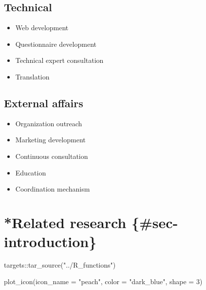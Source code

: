 \documentclass[
  letterpaper,
  DIV=11,
  numbers=noendperiod,
  oneside]{scrreprt}
\newenvironment{Shaded}{\begin{snugshade}}{\end{snugshade}}
\newcommand{\AttributeTok}[1]{\textcolor[rgb]{0.40,0.45,0.13}{#1}}
\newcommand{\DecValTok}[1]{\textcolor[rgb]{0.68,0.00,0.00}{#1}}
\newcommand{\FunctionTok}[1]{\textcolor[rgb]{0.28,0.35,0.67}{#1}}
\newcommand{\NormalTok}[1]{\textcolor[rgb]{0.00,0.23,0.31}{#1}}
\newcommand{\SpecialCharTok}[1]{\textcolor[rgb]{0.37,0.37,0.37}{#1}}
\newcommand{\StringTok}[1]{\textcolor[rgb]{0.13,0.47,0.30}{#1}}
\providecommand{\tightlist}{%
  \setlength{\itemsep}{0pt}\setlength{\parskip}{0pt}}\usepackage{longtable,booktabs,array}
\begin{document}
\hypertarget{technical}{%
\section{Technical}\label{technical}}

\begin{itemize}
\tightlist
\item
  Web development
\item
  Questionnaire development
\item
  Technical expert consultation
\item
  Translation
\end{itemize}

\hypertarget{external-affairs}{%
\section{External affairs}\label{external-affairs}}

\begin{itemize}
\tightlist
\item
  Organization outreach
\item
  Marketing development
\item
  Continuous consultation
\item
  Education
\item
  Coordination mechanism
\end{itemize}

\hypertarget{related-research-sec-introduction}{%
\chapter{*Related research
\{\#sec-introduction\}}\label{related-research-sec-introduction}}

\begin{Shaded}
\begin{Highlighting}[]
\NormalTok{targets}\SpecialCharTok{::}\FunctionTok{tar\_source}\NormalTok{(}\StringTok{"../R\_functions"}\NormalTok{)}
\end{Highlighting}
\end{Shaded}

\begin{Shaded}
\begin{Highlighting}[]
\FunctionTok{plot\_icon}\NormalTok{(}\AttributeTok{icon\_name =} \StringTok{"peach"}\NormalTok{, }\AttributeTok{color =} \StringTok{"dark\_blue"}\NormalTok{, }\AttributeTok{shape =} \DecValTok{3}\NormalTok{)}
\end{Highlighting}
\end{Shaded}
\end{document}
